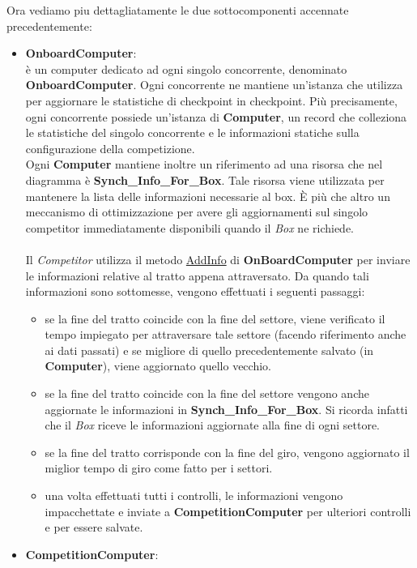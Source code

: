 Ora vediamo piu dettagliatamente le due sottocomponenti accennate precedentemente:
\begin{itemize}
\item \textbf{OnboardComputer}:\\
\`{e} un computer dedicato ad ogni singolo concorrente, denominato \textbf{OnboardComputer}. Ogni concorrente ne mantiene un'istanza che utilizza
per aggiornare le statistiche di checkpoint in checkpoint. Pi\`{u} precisamente, ogni concorrente possiede un'istanza di \textbf{Computer}, un record
che colleziona le statistiche del singolo concorrente e le informazioni statiche sulla configurazione della competizione.\\
Ogni \textbf{Computer} mantiene inoltre un riferimento ad una risorsa che nel diagramma \`{e} \textbf{Synch\_Info\_For\_Box}. Tale risorsa
viene utilizzata per mantenere la lista delle informazioni necessarie al box. \`{E} pi\`{u} che altro un meccanismo di ottimizzazione per avere
gli aggiornamenti sul singolo competitor immediatamente disponibili quando il \emph{Box} ne richiede.\\\\
Il \emph{Competitor} utilizza il metodo \underline{AddInfo} di \textbf{OnBoardComputer} 
per inviare le informazioni relative al tratto appena attraversato. Da quando tali informazioni sono sottomesse, vengono effettuati i seguenti
passaggi:
\begin{itemize}
\item se la fine del tratto coincide con la fine del settore, viene verificato il tempo impiegato per attraversare tale settore (facendo riferimento
anche ai dati passati) e se migliore di quello precedentemente salvato (in \textbf{Computer}), viene aggiornato quello vecchio.
\item se la fine del tratto coincide con la fine del settore vengono anche aggiornate le informazioni in \textbf{Synch\_Info\_For\_Box}. 
Si ricorda infatti che il \emph{Box} riceve le informazioni aggiornate alla fine di ogni settore.
\item se la fine del tratto corrisponde con la fine del giro, vengono aggiornato il miglior tempo di giro come fatto per i settori.
\item una volta effettuati tutti i controlli, le informazioni vengono impacchettate e inviate a \textbf{CompetitionComputer} per ulteriori
controlli e per essere salvate.
\end{itemize}
\item \textbf{CompetitionComputer}:\\

\end{itemize}
